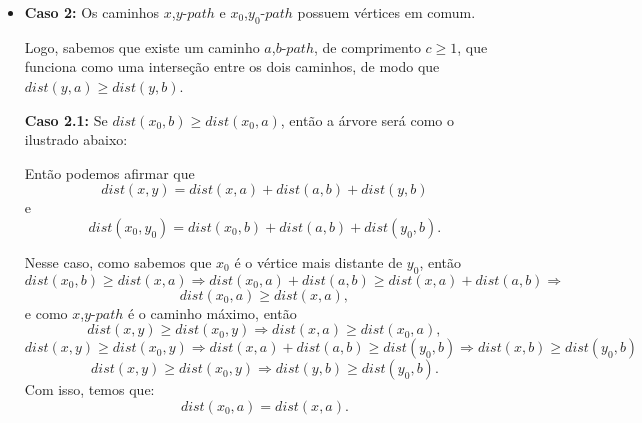 \documentclass[a4paper,12pt]{article}
\begin{document}
\begin{itemize}
		\item \textbf{Caso 2:} Os caminhos $x$,$y$-$path$ e 
        $x_0$,$y_0$-$path$ possuem vértices em comum.
     	
     	Logo, sabemos que existe um caminho $a$,$b$-$path$, 
        de comprimento $c \ge 1$,
        que funciona como uma interseção entre os dois 
        caminhos, de modo que $dist(y,a)\ge dist(y,b)$.
        
        
        \bigskip

        \textbf{Caso 2.1:} Se 
        $dist(x_0,b)\ge dist(x_0,a)$, então a árvore será
        como o ilustrado abaixo:

		
		Então podemos afirmar que 
		$$ dist(x,y) = dist(x,a) + dist(a,b) + dist(y,b) $$ e
        $$ dist(x_0,y_0) = dist(x_0,b) + dist(a,b) + 
        dist(y_0,b).$$

		Nesse caso, como sabemos que $x_0$ é o vértice mais
		distante de $y_0$, então
		$$  dist(x_0,b)\ge dist(x,a) \Rightarrow 
		dist(x_0,a) + dist(a,b)\ge dist(x,a) + dist(a,b)
		\Rightarrow$$ 
		$$ dist(x_0,a)\ge dist(x,a), $$
		e como $x$,$y$-$path$ é o caminho máximo, então
		$$  dist(x,y)\ge dist(x_0,y) \Rightarrow 
		dist(x,a)\ge dist(x_0,a), $$ 
		$$  dist(x,y)\ge dist(x_0,y) \Rightarrow 
		dist(x,a) + dist(a,b)\ge dist(y_0,b)\Rightarrow
		dist(x,b)\ge dist(y_0,b) $$
		$$  dist(x,y)\ge dist(x_0,y) \Rightarrow 
		dist(y,b)\ge dist(y_0,b). $$
		Com isso, temos que: $$dist(x_0,a)=dist(x,a).$$


\end{itemize}
\end{document}
